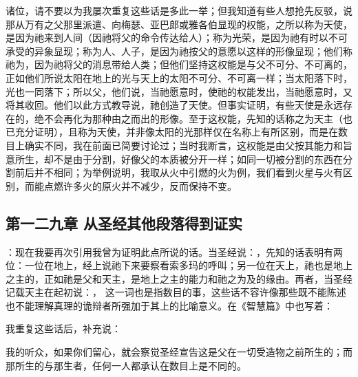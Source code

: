 诸位，请不要以为我屡次重复这些话是多此一举；但我知道有些人想抢先反驳，说那从万有之父那里派遣、向梅瑟、亚巴郎或雅各伯显现的权能，之所以称为天使，是因为祂来到人间（因祂将父的命令传达给人）；称为光荣，是因为祂有时以不可承受的异象显现；称为人、人子，是因为祂按父的意愿以这样的形像显现；他们称祂为，因为祂将父的消息带给人类；但他们坚持这权能是与父不可分、不可离的，正如他们所说太阳在地上的光与天上的太阳不可分、不可离一样；当太阳落下时，光也一同落下；所以父，他们说，当祂愿意时，使祂的权能发出，当祂愿意时，又将其收回。他们以此方式教导说，祂创造了天使。但事实证明，有些天使是永远存在的，绝不会再化为那种由之而出的形像。至于这权能，先知的话称之为天主（也已充分证明），且称为天使，并非像太阳的光那样仅在名称上有所区别，而是在数目上确实不同，我在前面已简要讨论过；当时我断言，这权能是由父按其能力和旨意所生，却不是由于分割，好像父的本质被分开一样；如同一切被分割的东西在分割前后并不相同；为举例说明，我取从火中引燃的火为例，我们看到火星与火有区别，而能点燃许多火的原火并不减少，反而保持不变。\par


\subsection{第一二九章 从圣经其他段落得到证实}

：现在我要再次引用我曾为证明此点所说的话。当圣经说：，先知的话表明有两位：一位在地上，经上说祂下来要察看索多玛的呼叫；另一位在天上，祂也是地上之主的，正如祂是父和天主，是地上之主的能力和祂之为及的缘由。再者，当圣经记载天主在起初说：， 这一词也是指数目的事，这些话不容许像那些既不能陈述也不能理解真理的诡辩者所强加于其上的比喻意义。在《智慧篇》中也写着：\par

我重复这些话后，补充说：\par

我的听众，如果你们留心，就会察觉圣经宣告这是父在一切受造物之前所生的；而那所生的与那生者，任何一人都承认在数目上是不同的。\par



